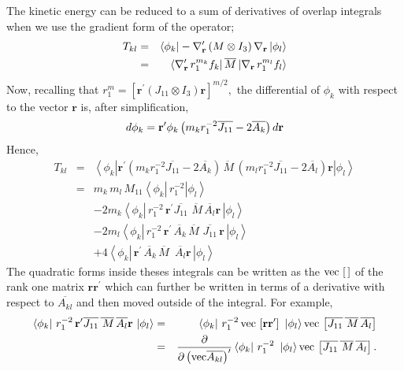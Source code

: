 \documentclass[12pt,doublespace]{article}
\begin{document}
The kinetic energy can be reduced to a sum of derivatives of overlap
integrals when we use the gradient form of the operator; 
\begin{eqnarray}
T_{kl} &=&\left\langle \phi _{k}\right| -\nabla _{\mathbf{r}}^{\prime
}\left( M\otimes I_{3}\right) \nabla _{\mathbf{r}}\left| \phi
_{l}\right\rangle \\
&=&\left\langle \nabla _{\mathbf{r}}^{\prime }\,r_{1}^{m_{k}}f_{k}\right| 
\overline{M}\left| \nabla _{\mathbf{r}}\,r_{1}^{m_{l}}f_{l}\right\rangle 
\notag
\end{eqnarray}
Now, recalling that $r_{1}^{m}=\left[ \mathbf{r}^{\prime }(J_{11}\otimes
I_{3})\mathbf{r}\right] ^{m/2},$ the differential of $\phi _{k}$ with
respect to the vector $\mathbf{r}$ is, after simplification, 
\begin{equation}
d\phi _{k}=\mathbf{r}^{\prime }\phi _{k}\left( m_{k}r_{1}^{-2}\overline{%
J_{11}}-2\overline{A_{k}}\right) d\mathbf{r}
\end{equation}
Hence, 
\begin{eqnarray}
T_{kl} &=&\left\langle \phi _{k}\right| \mathbf{r}^{\prime }\left(
m_{k}r_{1}^{-2}\overline{J_{11}}-2\overline{A_{k}}\right) \overline{\,M}%
\,\left( m_{l}r_{1}^{-2}\overline{J_{11}}-2\overline{A_{l}}\right) \mathbf{r}%
\left| \phi _{l}\right\rangle \\
&=&m_{k}\,m_{l}\,M_{11}\left\langle \phi _{k}\right| \,r_{1}^{-2}\left| \phi
_{l}\right\rangle \\
&&-2m_{k}\left\langle \phi _{k}\right| \,r_{1}^{-2}\,\mathbf{r}^{\prime }%
\overline{J_{11}}\,\overline{\,M}\,\overline{A_{l}}\mathbf{r\,}\left| \phi
_{l}\right\rangle \\
&&-2m_{l}\left\langle \phi _{k}\right| \,r_{1}^{-2}\,\mathbf{r}^{\prime }%
\overline{\,A_{k}}\,\overline{M}\,\,\overline{J_{11}}\,\mathbf{r\,}\left|
\phi _{l}\right\rangle \\
&&+4\left\langle \phi _{k}\right| \,\mathbf{r}^{\prime }\overline{\,A_{k}}\,%
\overline{M}\,\,\,\overline{A_{l}}\mathbf{r\,}\left| \phi _{l}\right\rangle
\end{eqnarray}
The quadratic forms inside theses integrals can be written as the $\mathrm{%
vec}\,\left[ \,\right] $ of the rank one matrix $\mathbf{rr}^{\prime }$
which can further be written in terms of a derivative with respect to $%
\overline{A_{kl}}$ and then moved outside of the integral\cite{Kinghorn95a}.
For example, 
\begin{eqnarray}
\left\langle \phi _{k}\right| \,r_{1}^{-2}\,\mathbf{r}^{\prime }\overline{%
J_{11}}\,\overline{\,M}\,\overline{A_{l}}\mathbf{r\,}\left| \phi
_{l}\right\rangle &=&\left\langle \phi _{k}\right| \,r_{1}^{-2}\,\mathrm{vec}%
\,\left[ \mathbf{rr}^{\prime }\right] \mathbf{\,}\left| \phi
_{l}\right\rangle \mathrm{vec}\,\left[ \overline{J_{11}}\,\overline{\,M}\,%
\overline{A_{l}}\right] \\
&=&\frac{\partial }{\partial \left( \mathrm{vec}\overline{A_{kl}}\right)
^{\prime }}\left\langle \phi _{k}\right| \,r_{1}^{-2}\,\mathbf{\,}\left|
\phi _{l}\right\rangle \mathrm{vec}\,\left[ \overline{J_{11}}\,\overline{\,M}%
\,\overline{A_{l}}\right] .
\end{eqnarray}
\end{document}
